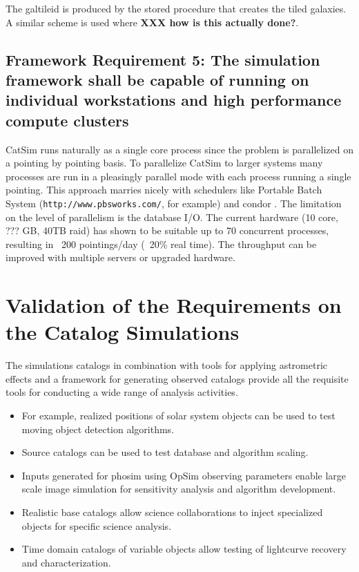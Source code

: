 \documentclass[]{article}
\begin{document}
{The galtileid is produced by the stored procedure that creates the tiled galaxies.  A similar scheme is used where 
{\bf XXX how is this actually done?}.

\subsection{Framework Requirement 5: The simulation framework shall be capable of running on individual workstations 
and high performance compute clusters}
CatSim runs naturally as a single core process since the problem is parallelized on a pointing by pointing basis.
To parallelize CatSim to larger systems many processes are run in a pleasingly parallel mode with each process running
a single pointing.  This approach marries nicely with schedulers like Portable Batch System ({\tt http://www.pbsworks.com/}, for example) 
and condor \citep{condor}.  
The limitation on the level of parallelism 
is the database I/O.  The current hardware (10 core, ??? GB, 40TB raid) has shown to be suitable up to 70 concurrent processes, 
resulting in ~200 pointings/day (~20\% real time).  The throughput can be improved with multiple servers or upgraded hardware.

\section{Validation of the Requirements on the Catalog Simulations}
The simulations catalogs in combination with tools for applying astrometric effects and a 
framework for generating observed catalogs provide all the requisite tools for conducting a 
wide range of analysis activities.
\begin{itemize}
\item For example, realized positions of solar system objects can be used to test moving object detection algorithms.
\item Source catalogs can be used to test database and algorithm scaling.
\item Inputs generated for phosim using OpSim observing parameters enable large scale image simulation
for sensitivity analysis and algorithm development.
\item Realistic base catalogs allow science collaborations to inject specialized objects for specific science
analysis.
\item Time domain catalogs of variable objects allow testing of lightcurve recovery and characterization.
\end{itemize}

}
\end{document}
